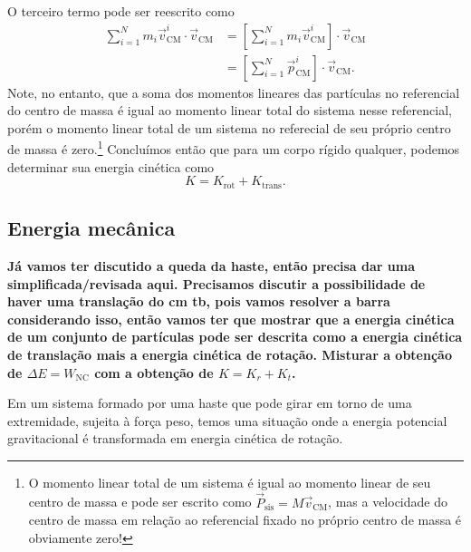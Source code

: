 O terceiro termo pode ser reescrito como
\begin{align}
    \sum_{i=1}^N m_i \vec{v}^i_{\text{CM}} \cdot \vec{v}_{\text{CM}} &= \left[\sum_{i=1}^N m_i \vec{v}^i_{\text{CM}}\right] \cdot \vec{v}_{\text{CM}} \\
    &= \left[\sum_{i = 1}^N \vec{p}^i_{\text{CM}}\right]\cdot \vec{v}_{\text{CM}}.
\end{align}
%
Note, no entanto, que a soma dos momentos lineares das partículas no referencial do centro de massa é igual ao momento linear total do sistema nesse referencial, porém o momento linear total de um sistema no referecial de seu próprio centro de massa é zero.\footnote{O momento linear total de um sistema é igual ao momento linear de seu centro de massa e pode ser escrito como $\vec{P}_{\text{sis}} = M\vec{v}_{\text{CM}}$, mas a velocidade do centro de massa em relação ao referencial fixado no próprio centro de massa é obviamente zero!} Concluímos então que para um corpo rígido qualquer, podemos determinar sua energia cinética como
\begin{equation}
    K = K_{\text{rot}} + K_{\text{trans}}.
\end{equation}

\subsection{Energia mecânica}

\textbf{Já vamos ter discutido a queda da haste, então precisa dar uma simplificada/revisada aqui. Precisamos discutir a possibilidade de haver uma translação do cm tb, pois vamos resolver a barra considerando isso, então vamos ter que mostrar que a energia cinética de um conjunto de partículas pode ser descrita como a energia cinética de translação mais a energia cinética de rotação. Misturar a obtenção de $\Delta E = W_{\text{NC}}$ com a obtenção de $K = K_r + K_t$.}
\begin{marginfigure}
\centering
{}
\caption{Em um sistema formado por uma haste que pode girar em torno de uma extremidade, sujeita à força peso, temos uma situação onde a energia potencial gravitacional é transformada em energia cinética de rotação. \label{Fig:EnergiaMecanicaNaRotacao}}
\end{marginfigure}

